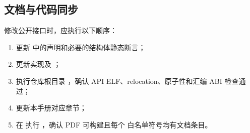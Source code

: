 \documentclass[../dayan_kernel_manual.tex]{subfiles}
\begin{document}
\subsection{文档与代码同步}

修改公开接口时，应执行以下顺序：

\begin{enumerate}
  \item 更新  中的声明和必要的结构体静态断言；
  \item 更新实现及 ；
  \item 执行仓库根目录 ，确认 API ELF、relocation、原子性和汇编
        ABI 检查通过；
  \item 更新本手册对应章节；
  \item 在  执行 ，确认 PDF 可构建且每个
        白名单符号均有文档条目。
\end{enumerate}
\end{document}
